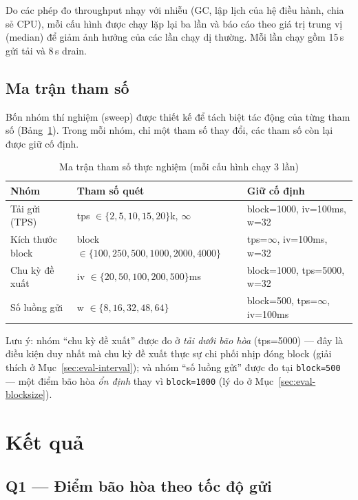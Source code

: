 Do các phép đo throughput nhạy với nhiễu (GC, lập lịch của hệ điều hành, chia sẻ
CPU), mỗi cấu hình được chạy lặp lại ba lần và báo cáo theo giá trị
trung vị (median) để giảm ảnh hưởng của các lần chạy dị thường. Mỗi lần
chạy gồm 15\,s gửi tải và 8\,s drain.

\subsection{Ma trận tham số}
\label{sec:eval-matrix}

Bốn nhóm thí nghiệm (sweep) được thiết kế để tách biệt tác động của từng tham số
(Bảng~\ref{tab:eval-matrix}). Trong mỗi nhóm, chỉ một tham số thay đổi, các tham
số còn lại được giữ cố định.

\begin{table}[H]
\centering
\caption{Ma trận tham số thực nghiệm (mỗi cấu hình chạy 3 lần)}
\label{tab:eval-matrix}
\begin{tabular}{@{}p{3.2cm}p{4.3cm}p{4.8cm}@{}}
\toprule
\textbf{Nhóm} & \textbf{Tham số quét} & \textbf{Giữ cố định} \\
\midrule
Tải gửi (TPS) & tps $\in \{2, 5, 10, 15, 20\}$k, $\infty$ & block=1000, iv=100ms, w=32 \\
Kích thước block & block $\in \{100, 250, 500, 1000, 2000, 4000\}$ & tps=$\infty$, iv=100ms, w=32 \\
Chu kỳ đề xuất & iv $\in \{20, 50, 100, 200, 500\}$ms & block=1000, tps=5000, w=32 \\
Số luồng gửi & w $\in \{8, 16, 32, 48, 64\}$ & block=500, tps=$\infty$, iv=100ms \\
\bottomrule
\end{tabular}
\end{table}

Lưu ý: nhóm ``chu kỳ đề xuất'' được đo ở \textit{tải dưới bão hòa} (tps=5000) ---
đây là điều kiện duy nhất mà chu kỳ đề xuất thực sự chi phối nhịp đóng block (giải
thích ở Mục~\ref{sec:eval-interval}); và nhóm ``số luồng gửi'' được đo tại
\texttt{block=500} --- một điểm bão hòa \textit{ổn định} thay vì \texttt{block=1000}
(lý do ở Mục~\ref{sec:eval-blocksize}).

\section{Kết quả}
\label{sec:eval-results}

\subsection{Q1 --- Điểm bão hòa theo tốc độ gửi}
\label{sec:eval-tps}

